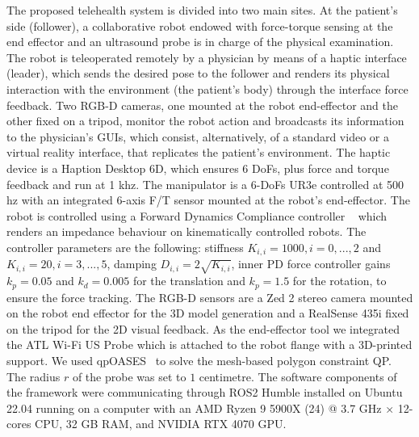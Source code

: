 The proposed telehealth system is divided into two main sites. At the patient's side (follower), a collaborative robot endowed with force-torque sensing at the end effector and an ultrasound probe is in charge of the physical examination. 
The robot is teleoperated remotely by a physician by means of a haptic interface (leader), which sends the desired pose to the follower and renders its physical interaction with the environment (the patient's body) through the interface force feedback. Two RGB-D cameras, one mounted at the robot end-effector and the other fixed on a tripod, monitor the robot action and broadcasts its information to the physician's GUIs, which consist, alternatively, of a standard video or a virtual reality interface, that replicates the patient's environment.
The haptic device is a Haption Desktop 6D, which ensures 6 DoFs, plus force and torque feedback and run at 1 khz. The manipulator is a 6-DoFs UR3e controlled at 500 hz with an integrated 6-axis F/T sensor mounted at the robot’s end-effector.  
The robot is controlled using a Forward Dynamics Compliance  controller ~\cite{scherzinger2017forward} which renders an impedance behaviour on kinematically controlled robots. The controller parameters are the following: stiffness $K_{i,i} = 1000, i = 0,...,2$ and $K_{i,i} = 20, i = 3,...,5$, damping $D_{i,i} = 2 \sqrt{K_{i,i}}$, inner PD force controller gains $k_p = 0.05$ and $k_d = 0.005$ for the translation and $k_p = 1.5$ for the rotation, to ensure the force tracking. The RGB-D sensors are a Zed 2 stereo camera mounted on the robot end effector for the 3D model generation and a RealSense 435i fixed on the tripod for the 2D visual feedback.
As the end-effector tool we integrated the ATL Wi-Fi US Probe which is attached to the robot flange with a 3D-printed support. We used qpOASES~\cite{ferreau2014qpoases} to solve the mesh-based polygon constraint QP. The radius $r$ of the probe was set to $1$ centimetre. The software components of the framework were communicating through ROS2 Humble installed on Ubuntu 22.04 running on a computer with an AMD Ryzen 9 5900X (24) @ 3.7 GHz × 12-cores CPU, 32 GB RAM, and NVIDIA RTX 4070 GPU.

